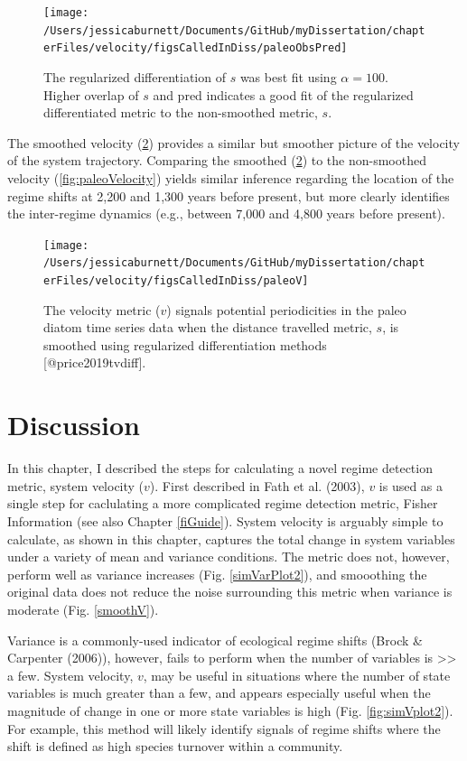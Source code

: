 \documentclass[12pt,twoside,openany]{reedthesis}
\begin{document}
\begin{figure}
\texttt{[image: /Users/jessicaburnett/Documents/GitHub/myDissertation/chapterFiles/velocity/figsCalledInDiss/paleoObsPred]} \caption{The regularized differentiation of $s$ was best fit using $\alpha = 100$. Higher overlap of $s$ and pred indicates a good fit of the regularized differentiated metric to the non-smoothed metric, $s$.}\label{fig:paleoObsPred}
\end{figure}
The smoothed velocity (\ref{fig:paleoV}) provides a similar but smoother picture of the velocity of the system trajectory. Comparing the smoothed (\ref{fig:paleoV}) to the non-smoothed velocity (\ref{fig:paleoVelocity}) yields similar inference regarding the location of the regime shifts at 2,200 and 1,300 years before present, but more clearly identifies the inter-regime dynamics (e.g., between 7,000 and 4,800 years before present).
\begin{figure}
\texttt{[image: /Users/jessicaburnett/Documents/GitHub/myDissertation/chapterFiles/velocity/figsCalledInDiss/paleoV]} \caption{The velocity metric  ($v$) signals potential periodicities in the paleo diatom time series data when the distance travelled metric, $s$, is smoothed using regularized differentiation methods [@price2019tvdiff].}\label{fig:paleoV}
\end{figure}
\hypertarget{discussion-3}{%
\section{Discussion}\label{discussion-3}}

In this chapter, I described the steps for calculating a novel regime detection metric, system velocity (\(v\)). First described in Fath et al. (2003), \(v\) is used as a single step for caclulating a more complicated regime detection metric, Fisher Information (see also Chapter \ref{fiGuide}). System velocity is arguably simple to calculate, as shown in this chapter, captures the total change in system variables under a variety of mean and variance conditions. The metric does not, however, perform well as variance increases (Fig. \ref{simVarPlot2}), and smooothing the original data does not reduce the noise surrounding this metric when variance is moderate (Fig. \ref{smoothV}).

Variance is a commonly-used indicator of ecological regime shifts (Brock \& Carpenter (2006)), however, fails to perform when the number of variables is \textgreater\textgreater{} a few. System velocity, \(v\), may be useful in situations where the number of state variables is much greater than a few, and appears especially useful when the magnitude of change in one or more state variables is high (Fig. \ref{fig:simVplot2}). For example, this method will likely identify signals of regime shifts where the shift is defined as high species turnover within a community.
\end{document}
